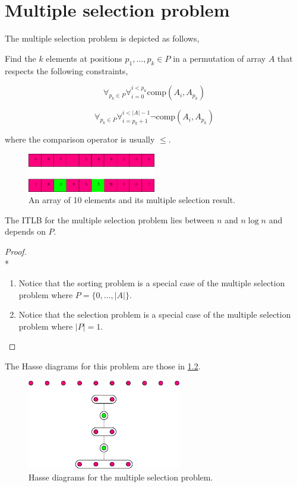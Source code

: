 \chapter{Multiple selection problem}
\label{tree:MS}

The multiple selection problem is depicted as follows,

Find the $k$ elements at positions $p_1, \dots, p_k \in P$ in a permutation of array $A$ that respects the following constraints,

\begin{equation}
\forall_{p_k \in P}\forall_{i = 0}^{i < p_k} \text{comp}(A_i, A_{p_k})
\end{equation}

\begin{equation}
\forall_{p_k \in P}\forall_{i = p_k + 1}^{i < |A| - 1} \neg\text{comp}(A_i, A_{p_k})
\end{equation}

where the comparison operator is usually $\leq$.\\


\begin{figure}
	\centering
	\includegraphics[width=0.5\textwidth]{fig/ms:array}
	\caption{\label{fig:ms:array} An array of 10 elements and its multiple selection result.}
\end{figure}


\begin{theorem}
The ITLB for the multiple selection problem lies between $n$ and $n \log n$ and depends on $P$.
\end{theorem}

\begin{proof}\mbox{}\\*
\begin{enumerate}
\item Notice that the sorting problem is a special case of the multiple selection problem where $P = \{0,\dots,|A|\}$.
\item Notice that the selection problem is a special case of the multiple selection problem where $|P| = 1$.
\end{enumerate}
\end{proof}

The Hasse diagrams for this problem are those in \ref{fig:ms:diag}.

\begin{figure}
	\centering
	\includegraphics[width=0.6\textwidth]{fig/ms:diag}
	\caption{\label{fig:ms:diag} Hasse diagrams for the multiple selection problem.}
\end{figure}